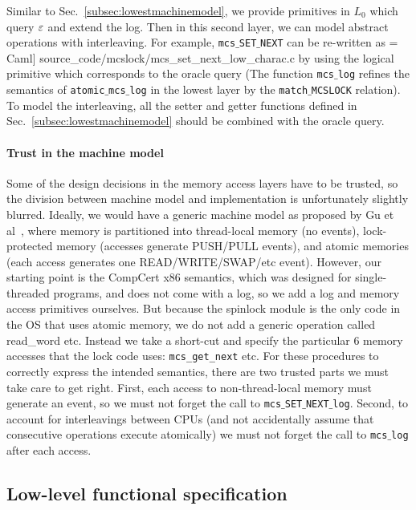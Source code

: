 Similar to Sec.~\ref{subsec:lowestmachinemodel}, we provide primitives in $L_0$ which query $\oracle$ and extend the log.
Then in this second layer, we can model abstract operations with interleaving.
For example, \texttt{mcs$\_$SET$\_$NEXT} can be re-written as
 = Caml] {source_code/mcslock/mcs_set_next_low_charac.c}
by using the logical primitive which corresponds to the oracle query
(The function \texttt{mcs$\_$log} refines the semantics of \texttt{atomic$\_$mcs$\_$log} in the lowest layer by the \texttt{match$\_$MCSLOCK} relation).
To model the interleaving, all the setter and getter functions defined
in Sec.~\ref{subsec:lowestmachinemodel} should be combined with the
oracle query.

\paragraph{Trust in the machine model}
Some of the design decisions in the memory access
layers have to be trusted, so the division between machine model and
implementation is unfortunately slightly blurred.
Ideally, we would have a generic machine model as proposed by Gu et
al~\cite{certikos16}, where memory is partitioned into thread-local
memory (no events), lock-protected memory (accesses generate PUSH/PULL
events), and atomic memories (each access
generates one READ/WRITE/SWAP/etc event).  However, our starting point
is the CompCert x86 semantics, which was designed for single-threaded
programs, and does not come with a log, so we add a log and memory access
primitives ourselves.
But because the spinlock module is the only code in the OS that uses
atomic memory, we do not add a generic operation called
read\_word etc. Instead we take a short-cut and specify the particular
6 memory accesses that the lock code uses: \lstinline$mcs_get_next$ etc.
For these procedures to correctly express the intended semantics,
there are two trusted parts we must take care to get right. First,
each access to non-thread-local memory must generate an event, so we
must not forget the call to
\texttt{mcs$\_$SET$\_$NEXT$\_$log}. 
Second, to account for
interleavings between CPUs (and not accidentally assume that consecutive
operations execute atomically) we must not forget the call to
\texttt{mcs$\_$log} after each access.


\subsection{Low-level functional specification}
\label{subsec:atomicoperation}

